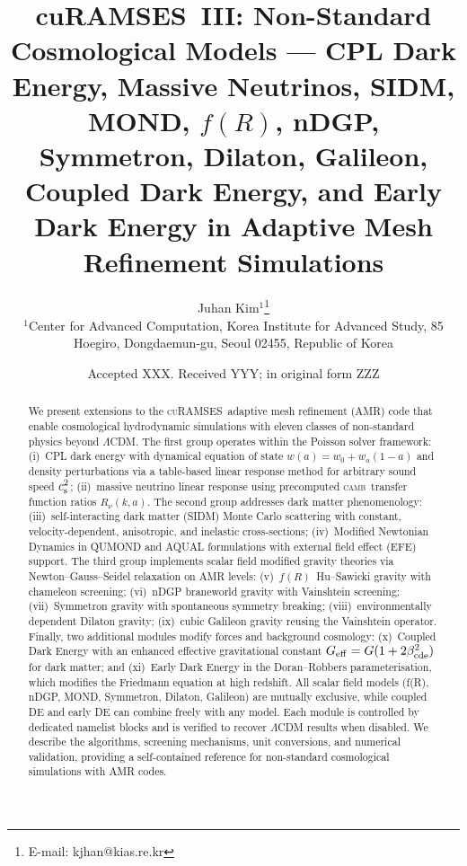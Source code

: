 \documentclass[fleqn,usenatbib]{mnras}
\title[cuRAMSES~III: Non-Standard Cosmological Models]
{cuRAMSES~III: Non-Standard Cosmological Models ---
CPL Dark Energy, Massive Neutrinos, SIDM, MOND,
$f(R)$, nDGP, Symmetron, Dilaton, Galileon, Coupled Dark Energy,
and Early Dark Energy
in Adaptive Mesh Refinement Simulations}
\author[J.~Kim]{
Juhan Kim$^{1}$\thanks{E-mail: kjhan@kias.re.kr}
\\
$^{1}$Center for Advanced Computation, Korea Institute for Advanced Study,
85 Hoegiro, Dongdaemun-gu, Seoul 02455, Republic of Korea
}
\date{Accepted XXX. Received YYY; in original form ZZZ}
\newcommand{\curamses}{\textsc{cuRAMSES}}
\newcommand{\camb}{\textsc{camb}}
\newcommand{\Rnu}{R_\nu}
\newcommand{\cst}{c_{\rm s}^2}
\newcommand{\fR}{f(R)}
\newcommand{\Geff}{G_{\rm eff}}
\newcommand{\betacde}{\beta_{\rm cde}}
\begin{document}
\label{firstpage}
\pagerange{\pageref{firstpage}--\pageref{lastpage}}

\maketitle

\begin{abstract}
We present extensions to the \curamses\ adaptive mesh refinement (AMR)
code that enable cosmological hydrodynamic simulations with eleven
classes of non-standard physics beyond $\Lambda$CDM.  The first group
operates within the Poisson solver framework: (i)~CPL dark energy with
dynamical equation of state $w(a)=w_0+w_a(1-a)$ and density
perturbations via a table-based linear response method for arbitrary
sound speed $\cst$; (ii)~massive neutrino linear response using
precomputed \camb\ transfer function ratios $\Rnu(k,a)$.  The second
group addresses dark matter phenomenology: (iii)~self-interacting dark
matter (SIDM) Monte Carlo scattering with constant,
velocity-dependent, anisotropic, and inelastic cross-sections;
(iv)~Modified Newtonian Dynamics in QUMOND and AQUAL formulations with
external field effect (EFE) support.  The third group implements
scalar field modified gravity theories via Newton--Gauss--Seidel
relaxation on AMR levels: (v)~$\fR$~Hu--Sawicki gravity with
chameleon screening; (vi)~nDGP braneworld gravity with Vainshtein
screening; (vii)~Symmetron gravity with spontaneous symmetry breaking;
(viii)~environmentally dependent Dilaton gravity; (ix)~cubic Galileon
gravity reusing the Vainshtein operator.  Finally, two additional
modules modify forces and background cosmology: (x)~Coupled Dark
Energy with an enhanced effective gravitational constant
$\Geff = G(1+2\betacde^2)$ for dark matter; and (xi)~Early Dark
Energy in the Doran--Robbers parameterisation, which modifies the
Friedmann equation at high redshift.  All scalar field models (f(R),
nDGP, MOND, Symmetron, Dilaton, Galileon) are mutually exclusive,
while coupled DE and early DE can combine freely with any model.  Each
module is controlled by dedicated namelist blocks and is verified to
recover $\Lambda$CDM results when disabled.  We describe the
algorithms, screening mechanisms, unit conversions, and numerical
validation, providing a self-contained reference for non-standard
cosmological simulations with AMR codes.
\end{abstract}
\end{document}
